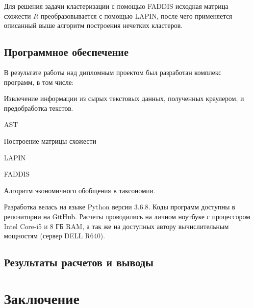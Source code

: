 \documentclass[12pt]{article}
\newenvironment{itemize*}%
{\begin{itemize}%
		\setlength{\itemsep}{0pt}%
		\setlength{\parskip}{0pt}}%
	{\end{itemize}}
\begin{document}
Для решения задачи кластеризации с помощью FADDIS исходная матрица схожести $R$ преобразовывается с помощью LAPIN, после чего применяется описанный выше алгоритм построения нечетких кластеров.

\subsection{Программное обеспечение}

В результате работы над дипломным проектом был разработан комплекс программ, в том числе:

\begin{itemize*} %
	\item Извлечение информации из сырых текстовых данных, полученных краулером, и предобработка текстов.
	\item AST
	\item Построение матрицы схожести 
	\item LAPIN
	\item FADDIS
	\item Алгоритм экономичного обобщения в таксономии.
\end{itemize*} %

Разработка велась на языке Python версии 3.6.8. Коды программ доступны в репозитории на GitHub. %
Расчеты проводились на личном ноутбуке с процессором Intel Core-i5 и 8 ГБ RAM, а так же на доступных автору вычислительным мощностям (сервер DELL R640).

\subsection{Результаты расчетов и выводы}

\section{Заключение}



\nocite{*}
 


\appendix
\end{document}
